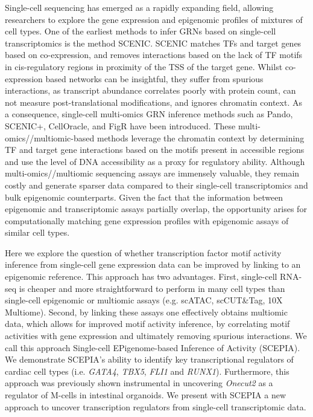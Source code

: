 Single-cell sequencing has emerged as a rapidly expanding field, allowing researchers to explore the gene expression and epigenomic profiles of mixtures of cell types. One of the earliest methods to infer GRNs based on single-cell transcriptomics is the method SCENIC\cite{Aibar_2017}. SCENIC matches TFs and target genes based on co-expression, and removes interactions based on the lack of TF motifs in cis-regulatory regions in proximity of the TSS of the target gene. Whilst co-expression based networks can be insightful, they suffer from spurious interactions, as transcript abundance correlates poorly with protein count\cite{Fortelny2017,Franks2017}, can not measure post-translational modifications, and ignores chromatin context. As a consequence, single-cell multi-omics GRN inference methods such as Pando\cite{Fleck}, SCENIC+\cite{Gonz_lez_Blas_2022}, CellOracle\cite{Kamimoto2023}, and FigR\cite{Kartha2022} have been introduced. These multi-omics//multiomic-based methods leverage the chromatin context by determining TF and target gene interactions based on the motifs present in accessible regions and use the level of DNA accessibility as a proxy for regulatory ability. Although multi-omics//multiomic sequencing assays are immensely valuable, they remain costly and generate sparser data compared to their single-cell transcriptomics and bulk epigenomic counterparts\cite{Li2021}. Given the fact that the information between epigenomic and transcriptomic assays partially overlap\cite{Wang2016,GonzlezRamrez2021}, the opportunity arises for computationally matching gene expression profiles with epigenomic assays of similar cell types. 

Here we explore the question of whether transcription factor motif activity inference from single-cell gene expression data can be improved by linking to an epigenomic reference. This approach has two advantages. First, single-cell RNA-seq is cheaper and more straightforward to perform in many cell types than single-cell epigenomic or multiomic assays (e.g. scATAC, scCUT\&Tag, 10X Multiome). Second, by linking these assays one effectively obtains multiomic data, which allows for improved motif activity inference, by correlating motif activities with gene expression and ultimately removing spurious interactions. We call this approach Single-cell EPigenome-based Inference of Activity (SCEPIA). We demonstrate SCEPIA's ability to identify key transcriptional regulators of cardiac cell types (i.e. \textit{GATA4}, \textit{TBX5}, \textit{FLI1} and \textit{RUNX1}). Furthermore, this approach was previously shown instrumental in uncovering \textit{Onecut2} as a regulator of M-cells in intestinal organoids\cite{LunaVelez2023}. We present with SCEPIA a new approach to uncover transcription regulators from single-cell transcriptomic data. 

